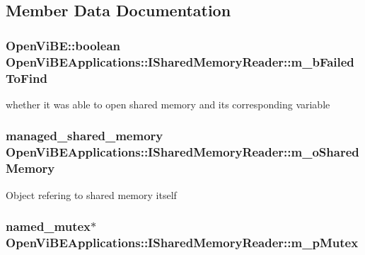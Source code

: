 \subsection{Member Data Documentation}
\hypertarget{classOpenViBEApplications_1_1ISharedMemoryReader_a917017622cf252bc27769d3284035613}{
\subsubsection[{m\_\-bFailedToFind}]{\setlength{\rightskip}{0pt plus 5cm}OpenViBE::boolean {\bf OpenViBEApplications::ISharedMemoryReader::m\_\-bFailedToFind}}}
\label{classOpenViBEApplications_1_1ISharedMemoryReader_a917017622cf252bc27769d3284035613}
whether it was able to open shared memory and its corresponding variable \hypertarget{classOpenViBEApplications_1_1ISharedMemoryReader_a04ab97091f1197fada7cd30085526c7b}{
\subsubsection[{m\_\-oSharedMemory}]{\setlength{\rightskip}{0pt plus 5cm}managed\_\-shared\_\-memory {\bf OpenViBEApplications::ISharedMemoryReader::m\_\-oSharedMemory}}}
\label{classOpenViBEApplications_1_1ISharedMemoryReader_a04ab97091f1197fada7cd30085526c7b}
Object refering to shared memory itself \hypertarget{classOpenViBEApplications_1_1ISharedMemoryReader_acb7b53ef01ff8121494d7b6ddeccab82}{
\subsubsection[{m\_\-pMutex}]{\setlength{\rightskip}{0pt plus 5cm}named\_\-mutex$\ast$ {\bf OpenViBEApplications::ISharedMemoryReader::m\_\-pMutex}}}
